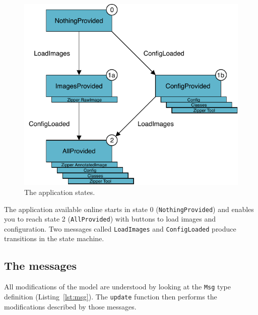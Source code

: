 \begin{figure}[ht]
\centering
\includegraphics[width=\columnwidth]{assets/img/states-draw-io.pdf}
\caption{The application states.}%
\label{fig:states}
\end{figure}

The application available online starts in state 0 (\verb|NothingProvided|)
and enables you to reach state 2 (\verb|AllProvided|)
with buttons to load images and configuration.
Two messages called \verb|LoadImages| and \verb|ConfigLoaded| produce
transitions in the state machine.


\subsection{The messages}

All modifications of the model are understood
by looking at the \verb|Msg| type definition (Listing~\ref{lst:msg}).
The \verb|update| function then performs the modifications described by those messages.



